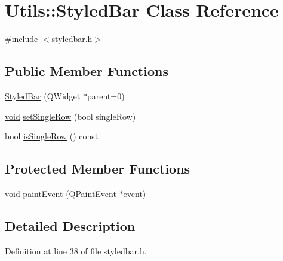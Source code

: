 \hypertarget{class_utils_1_1_styled_bar}{\section{\-Utils\-:\-:\-Styled\-Bar \-Class \-Reference}
\label{class_utils_1_1_styled_bar}
}


{\ttfamily \#include $<$styledbar.\-h$>$}

\subsection*{\-Public \-Member \-Functions}
\begin{DoxyCompactItemize}
\item 
\hyperlink{class_utils_1_1_styled_bar_a191ca303fdd1efdd8ca2e7d78e678bd8}{\-Styled\-Bar} (\-Q\-Widget $\ast$parent=0)
\item 
\hyperlink{group___u_a_v_objects_plugin_ga444cf2ff3f0ecbe028adce838d373f5c}{void} \hyperlink{class_utils_1_1_styled_bar_ae0468b2fdc01ce1025ef7ec9b1da109f}{set\-Single\-Row} (bool single\-Row)
\item 
bool \hyperlink{class_utils_1_1_styled_bar_aee19fe83b95c77581a06826031a6a897}{is\-Single\-Row} () const 
\end{DoxyCompactItemize}
\subsection*{\-Protected \-Member \-Functions}
\begin{DoxyCompactItemize}
\item 
\hyperlink{group___u_a_v_objects_plugin_ga444cf2ff3f0ecbe028adce838d373f5c}{void} \hyperlink{class_utils_1_1_styled_bar_acf3eab7743536d9fde75c2acb8fa8f9b}{paint\-Event} (\-Q\-Paint\-Event $\ast$event)
\end{DoxyCompactItemize}


\subsection{\-Detailed \-Description}


\-Definition at line 38 of file styledbar.\-h.



